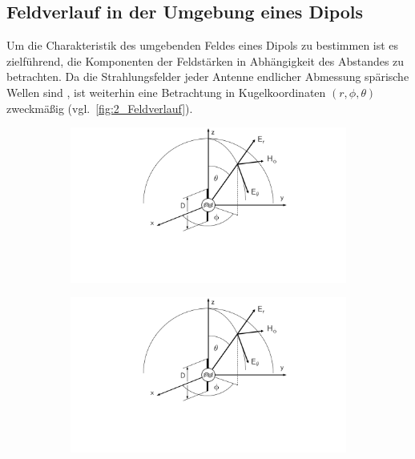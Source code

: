 \subsection{Feldverlauf in der Umgebung eines Dipols}\label{cha:2_sub_Feldverlauf_in_Umgebung_eines_Dipols}

Um die Charakteristik des umgebenden Feldes eines Dipols zu bestimmen ist es zielführend, die Komponenten der Feldstärken in Abhängigkeit des Abstandes zu betrachten. Da die Strahlungsfelder jeder Antenne endlicher Abmessung spärische Wellen sind \cite{Antenna_Theory}, ist weiterhin eine Betrachtung in Kugelkoordinaten $\left(r, \phi, \theta\right)$ zweckmäßig (vgl.~\Abb \ref{fig:2_Feldverlauf}). 

\begin{figure}
    \centering
    \begin{subfigure}[b]{0.4\textwidth}
        \includegraphics[page = 1, height=0.2\textheight, trim = 8.5cm 5cm 7cm 0cm, clip]{Abbildungen/Kapitel2/Hertz'scher_Dipol.pdf}
        \caption{\label{subfig:2_Feldverlauf_Koordinatensystem}}
    \end{subfigure}
    \hspace{1cm}
    \begin{subfigure}[b]{0.4\textwidth}
        \includegraphics[page = 2, height=0.2\textheight, trim = 8.5cm 3cm 7cm 2cm, clip]{Abbildungen/Kapitel2/Hertz'scher_Dipol.pdf}

\end{subfigure}
\end{figure}
